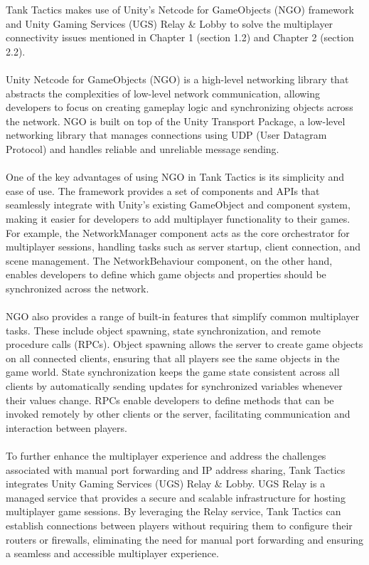 Tank Tactics makes use of Unity's Netcode for GameObjects (NGO) framework and Unity Gaming Services (UGS) Relay \& Lobby to solve the multiplayer connectivity issues mentioned in Chapter 1 (section 1.2) and Chapter 2 (section 2.2).
\\
\noindent
\\
Unity Netcode for GameObjects (NGO) is a high-level networking library that abstracts the complexities of low-level network communication, allowing developers to focus on creating gameplay logic and synchronizing objects across the network. NGO is built on top of the Unity Transport Package, a low-level networking library that manages connections using UDP (User Datagram Protocol) and handles reliable and unreliable message sending.
\\
\noindent
\\
One of the key advantages of using NGO in Tank Tactics is its simplicity and ease of use. The framework provides a set of components and APIs that seamlessly integrate with Unity's existing GameObject and component system, making it easier for developers to add multiplayer functionality to their games. For example, the NetworkManager component acts as the core orchestrator for multiplayer sessions, handling tasks such as server startup, client connection, and scene management. The NetworkBehaviour component, on the other hand, enables developers to define which game objects and properties should be synchronized across the network.
\\
\noindent
\\
NGO also provides a range of built-in features that simplify common multiplayer tasks. These include object spawning, state synchronization, and remote procedure calls (RPCs). Object spawning allows the server to create game objects on all connected clients, ensuring that all players see the same objects in the game world. State synchronization keeps the game state consistent across all clients by automatically sending updates for synchronized variables whenever their values change. RPCs enable developers to define methods that can be invoked remotely by other clients or the server, facilitating communication and interaction between players.
\\
\noindent
\\
To further enhance the multiplayer experience and address the challenges associated with manual port forwarding and IP address sharing, Tank Tactics integrates Unity Gaming Services (UGS) Relay \& Lobby. UGS Relay is a managed service that provides a secure and scalable infrastructure for hosting multiplayer game sessions. By leveraging the Relay service, Tank Tactics can establish connections between players without requiring them to configure their routers or firewalls, eliminating the need for manual port forwarding and ensuring a seamless and accessible multiplayer experience.

